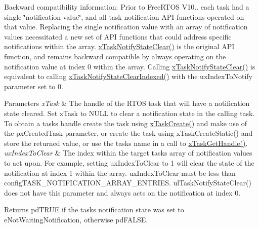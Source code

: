 Backward compatibility information\+: Prior to Free\+R\+T\+OS V10.. each task had a single \char`\"{}notification value\char`\"{}, and all task notification A\+PI functions operated on that value. Replacing the single notification value with an array of notification values necessitated a new set of A\+PI functions that could address specific notifications within the array. \hyperlink{externals_2freertos_2include_2task_8h_ad4a465a489d7c2b22130ec2cc68b3284}{x\+Task\+Notify\+State\+Clear()} is the original A\+PI function, and remains backward compatible by always operating on the notification value at index 0 within the array. Calling \hyperlink{externals_2freertos_2include_2task_8h_ad4a465a489d7c2b22130ec2cc68b3284}{x\+Task\+Notify\+State\+Clear()} is equivalent to calling \hyperlink{externals_2freertos_2include_2task_8h_ad7fc12476fa032389e0b3dd52ecb709f}{x\+Task\+Notify\+State\+Clear\+Indexed()} with the ux\+Index\+To\+Notify parameter set to 0.


\begin{DoxyParams}{Parameters}
{\em x\+Task} & The handle of the R\+T\+OS task that will have a notification state cleared. Set x\+Task to N\+U\+LL to clear a notification state in the calling task. To obtain a task\textquotesingle{}s handle create the task using \hyperlink{vendor_2ceedling_2plugins_2freertos_2src_2freertos_2include_2task_8h_adf67e7cd0bfd1eda9e8afd048206f7c2}{x\+Task\+Create()} and make use of the px\+Created\+Task parameter, or create the task using x\+Task\+Create\+Static() and store the returned value, or use the task\textquotesingle{}s name in a call to \hyperlink{externals_2freertos_2include_2task_8h_a45b3b1cd0227269609499beeeb8c5c26}{x\+Task\+Get\+Handle()}.\\
\hline
{\em ux\+Index\+To\+Clear} & The index within the target task\textquotesingle{}s array of notification values to act upon. For example, setting ux\+Index\+To\+Clear to 1 will clear the state of the notification at index 1 within the array. ux\+Index\+To\+Clear must be less than config\+T\+A\+S\+K\+\_\+\+N\+O\+T\+I\+F\+I\+C\+A\+T\+I\+O\+N\+\_\+\+A\+R\+R\+A\+Y\+\_\+\+E\+N\+T\+R\+I\+ES. ul\+Task\+Notify\+State\+Clear() does not have this parameter and always acts on the notification at index 0.\\
\hline
\end{DoxyParams}
\begin{DoxyReturn}{Returns}
pd\+T\+R\+UE if the task\textquotesingle{}s notification state was set to e\+Not\+Waiting\+Notification, otherwise pd\+F\+A\+L\+SE. 
\end{DoxyReturn}
